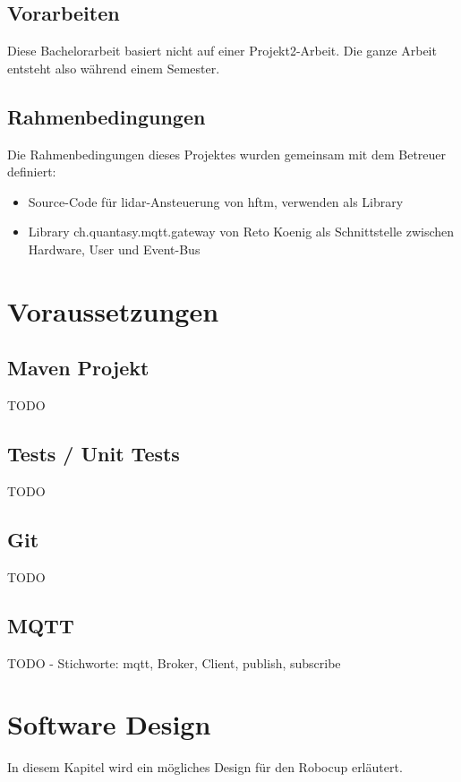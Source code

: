 \documentclass[11pt,english,german]{report}
\begin{document}
\section{Vorarbeiten}
Diese Bachelorarbeit basiert nicht auf einer Projekt2-Arbeit. Die ganze Arbeit entsteht also während einem Semester.

\section{Rahmenbedingungen}
Die Rahmenbedingungen dieses Projektes wurden gemeinsam mit dem Betreuer definiert:
\begin{itemize}
\item Source-Code für \acrshort{lidar}-Ansteuerung von \acrshort{hftm}, verwenden als Library
\item Library ch.quantasy.mqtt.gateway\cite{ch.quantasy.mqtt.gateway} von Reto Koenig als Schnittstelle zwischen Hardware, User und Event-Bus
\end{itemize}


\chapter{Voraussetzungen}
\section{Maven Projekt}
TODO
\section{Tests / Unit Tests}
TODO
\section{Git}
TODO
\section{MQTT}
\label{sec:mqtt}
TODO - Stichworte: \acrshort{mqtt}, Broker, Client, publish, subscribe

\chapter{Software Design}
In diesem Kapitel wird ein mögliches Design für den Robocup erläutert.
\end{document}
